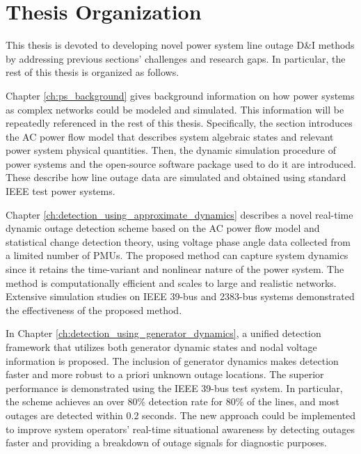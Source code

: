 \section{Thesis Organization}

This thesis is devoted to developing novel power system line outage D\&I methods by addressing previous sections' challenges and research gaps. In particular, the rest of this thesis is organized as follows.

Chapter \ref{ch:ps_background} gives background information on how power systems as complex networks could be modeled and simulated. This information will be repeatedly referenced in the rest of this thesis. Specifically, the section introduces the AC power flow model that describes system algebraic states and relevant power system physical quantities. Then, the dynamic simulation procedure of power systems and the open-source software package used to do it are introduced. These describe how line outage data are simulated and obtained using standard IEEE test power systems.


Chapter \ref{ch:detection_using_approximate_dynamics} describes a novel real-time dynamic outage detection scheme based on the AC power flow model and statistical change detection theory, using voltage phase angle data collected from a limited number of PMUs. The proposed method can capture system dynamics since it retains the time-variant and nonlinear nature of the power system. The method is computationally efficient and scales to large and realistic networks. Extensive simulation studies on IEEE 39-bus and 2383-bus systems demonstrated the effectiveness of the proposed method.

In Chapter \ref{ch:detection_using_generator_dynamics}, a unified detection framework that utilizes both generator dynamic states and nodal voltage information is proposed. The inclusion of generator dynamics makes detection faster and more robust to a priori unknown outage locations. The superior performance is demonstrated using the IEEE 39-bus test system. In particular, the scheme achieves an over 80\% detection rate for 80\% of the lines, and most outages are detected within 0.2 seconds. 
The new approach could be implemented to improve system operators' real-time situational awareness by detecting outages faster and providing a breakdown of outage signals for diagnostic purposes.

